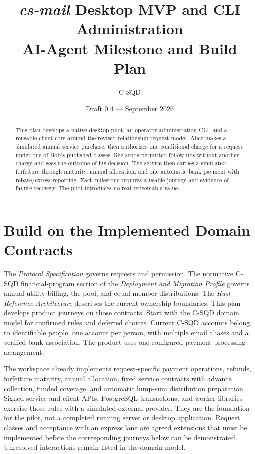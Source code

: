 \documentclass[11pt]{article}
\title{\textit{cs-mail} Desktop MVP and CLI Administration\\
\large AI-Agent Milestone and Build Plan}
\author{C-SQD}
\date{Draft 0.4 --- September 2026}
\begin{document}
\maketitle

\begin{abstract}
This plan develops a native desktop pilot, an operator administration CLI, and a
reusable client core around the revised relationship-request model. Alice makes
a simulated annual service purchase, then authorizes one conditional charge for
a request under one of Bob's published classes. She sends permitted follow-ups without another charge and sees
the outcome of his decision. The service then carries
a simulated forfeiture through maturity, annual allocation, and one automatic
bank payment with rebate/excess reporting. Each milestone requires a usable journey and evidence of failure
recovery. The pilot introduces no real redeemable value.
\end{abstract}

\section{Build on the Implemented Domain Contracts}

The \textit{Protocol Specification} governs requests and permission. The normative
C-SQD financial-program section of the \textit{Deployment and Migration Profile}
governs annual utility billing, the pool, and equal member distributions. The
\textit{Rust Reference Architecture} describes the current ownership boundaries.
This plan develops product journeys on those contracts. Start with the
\href{DOMAIN_MODEL.md}{C-SQD domain model} for confirmed rules and deferred
choices. Current C-SQD accounts belong to identifiable people, one account per
person, with multiple email aliases and a verified bank association. The product
uses one configured payment-processing arrangement.

The workspace already implements request-specific payment operations, refunds,
forfeiture maturity, annual allocation, fixed service contracts with advance
collection, funded coverage, and automatic lump-sum distribution preparation. Signed
service and client APIs, PostgreSQL transactions, and worker libraries exercise
those rules with a simulated external provider. They are the foundation for the
pilot, not a completed running server or desktop application.
Request classes and acceptance with an express lane are agreed extensions that
must be implemented before the corresponding journeys below can be demonstrated.
Unresolved interactions remain listed in the domain model.
\end{document}

